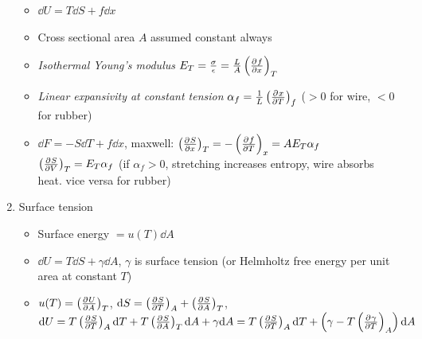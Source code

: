 \documentclass{article}
\theoremstyle{remark}
\newcommand{\ppdv}[4][]{\left(\pdv[#1]{#2}{#3}\right)_{#4}}
\begin{document}
\begin{enumerate}
\begin{itemize}
        \item $\dd U=T\dd S+f\dd x$
        \item Cross sectional area $A$ assumed constant always
        \item \emph{Isothermal Young's modulus} $E_T=\frac{\sigma}{\epsilon}=\frac{L}{A}\ppdv{f}{x}{T}$
        \item \emph{Linear expansivity at constant tension} $\alpha_f=\frac{1}{L}\ppdv{x}{T}{f}$ ($>0$ for wire, $<0$ for rubber)
        \item $\dd F = -S\dd T+f\dd x$, maxwell: $\ppdv{S}{x}{T}=-\ppdv{f}{T}{x}=AE_T\alpha_f$
                $\ppdv{S}{V}{T}=E_T\alpha_f$ (if $\alpha_f>0$, stretching increases entropy, wire absorbs heat. vice versa for rubber)
    \end{itemize}
    \item Surface tension\begin{itemize}
        \item Surface energy $=u(T)\dd A$
        \item $\dd U=T\dd S+\gamma\dd A$, $\gamma$ is surface tension (or Helmholtz free energy per unit area at constant $T$)
        \item $u(T)=\ppdv{U}{A}{T}$, $\dd S=\ppdv{S}{T}{A}+\ppdv{S}{A}{T}$, $\dd U=T\ppdv{S}{T}{A}\dd T+T\ppdv{S}{A}{T}\dd A+\gamma\dd A=
                T\ppdv{S}{T}{A}\dd T+\left(\gamma-T\ppdv{\gamma}{T}{A}\right)\dd A$


\end{itemize}
\end{enumerate}
\end{document}
